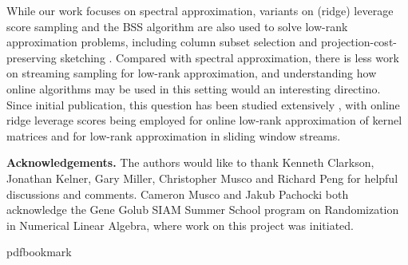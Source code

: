 \documentclass[11pt]{article}
\numberwithin{equation}{section}
\theoremstyle{definition}
\theoremstyle{plain}
\begin{document}
While our work focuses on spectral approximation, variants on (ridge) leverage score sampling and the BSS algorithm are also used to solve low-rank approximation problems, including column subset selection \cite{boutsidis2014optimal,cohen2015ridge} and projection-cost-preserving sketching \cite{cohen2014dimensionality,cohen2015ridge}. Compared with spectral approximation, there is less work on streaming sampling for low-rank approximation, and understanding how online algorithms may be used in this setting would an interesting directino. Since initial publication, this question has been studied  extensively \cite{braverman2018numerical,calandriello2017second,calandriello2017efficient}, with online ridge leverage scores being employed for online low-rank approximation of kernel matrices and for low-rank approximation in sliding window streams.

\medskip

\noindent\textbf{Acknowledgements.}
The authors would like to thank Kenneth Clarkson, Jonathan Kelner, Gary Miller, Christopher Musco and Richard Peng for helpful discussions and comments.
Cameron Musco and Jakub Pachocki both acknowledge the Gene Golub SIAM Summer School program on Randomization in Numerical Linear Algebra, where work on this project was initiated.

\nocite{conf-version}


\newcommand{\prelim}{Preliminary version in\ }
\providecommand{\bibhead}[1]{}
\expandafter\ifx\csname pdfbookmark\endcsname\relax%
  \providecommand{\tocrefpdfbookmark}{}
\else\providecommand{\tocrefpdfbookmark}{%
   \hypertarget{tocreferences}{}%
   \pdfbookmark[1]{References}{tocreferences}}%
\fi
\end{document}
